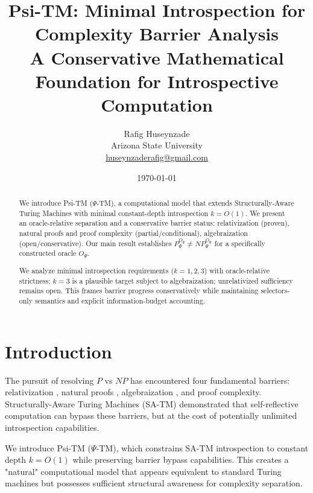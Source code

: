 \documentclass[11pt]{article}
\title{Psi-TM: Minimal Introspection for Complexity Barrier Analysis\\
\large{A Conservative Mathematical Foundation for Introspective Computation}}
\author{Rafig Huseynzade\\
Arizona State University\\
\href{mailto:huseynzaderafig@gmail.com}{huseynzaderafig@gmail.com}}
\date{\today}
\theoremstyle{definition}
\begin{document}
\maketitle

\begin{abstract}
We introduce Psi-TM ($\Psi$-TM), a computational model that extends Structurally-Aware Turing Machines with minimal constant-depth introspection $k = O(1)$. We present an oracle-relative separation and a conservative barrier status: relativization (proven), natural proofs and proof complexity (partial/conditional), algebraization (open/conservative). Our main result establishes $P^{O_\Psi}_\Psi \neq NP^{O_\Psi}_\Psi$ for a specifically constructed oracle $O_\Psi$.

We analyze minimal introspection requirements ($k=1,2,3$) with oracle-relative strictness; $k=3$ is a plausible target subject to algebraization; unrelativized sufficiency remains open. This frames barrier progress conservatively while maintaining selectors-only semantics and explicit information-budget accounting.
\end{abstract}

\tableofcontents
\newpage







\section{Introduction}

The pursuit of resolving $P$ vs $NP$ has encountered four fundamental barriers: relativization \cite{BGS75}, natural proofs \cite{RR97}, algebraization \cite{AW09}, and proof complexity. Structurally-Aware Turing Machines (SA-TM) \cite{SA-TM} demonstrated that self-reflective computation can bypass these barriers, but at the cost of potentially unlimited introspection capabilities.

We introduce Psi-TM ($\Psi$-TM), which constrains SA-TM introspection to constant depth $k = O(1)$ while preserving barrier bypass capabilities. This creates a "natural" computational model that appears equivalent to standard Turing machines but possesses sufficient structural awareness for complexity separation.
\end{document}
